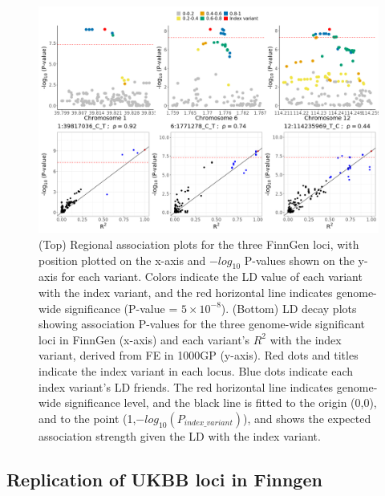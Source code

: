 \begin{figure}[H] 
  \centering    
  \includegraphics[width=1.0\textwidth]{Vector/finngen_regional_assoc_ld_decay_plots.png}
  \caption[Figure]{(Top) Regional association plots for the three FinnGen loci, with position plotted on the x-axis and $-log_{10}$ P-values shown on the y-axis for each variant. Colors indicate the LD value of each variant with the index variant, and the red horizontal line indicates genome-wide significance (P-value = $5\times10^{-8}$). (Bottom) LD decay plots showing association P-values for the three genome-wide significant loci in FinnGen (x-axis) and each variant's $R^{2}$ with the index variant, derived from FE in 1000GP (y-axis). Red dots and titles indicate the index variant in each locus. Blue dots indicate each index variant's LD friends. The red horizontal line indicates genome-wide significance level, and the black line is fitted to the origin (0,0), and to the point (1,$-log_{10}(P_{index\_variant})$), and shows the expected association strength given the LD with the index variant.}
  \label{fig:finngen_regional_assoc_ld_decay_plots}
  \end{figure}




\subsection{Replication of UKBB loci in Finngen}

